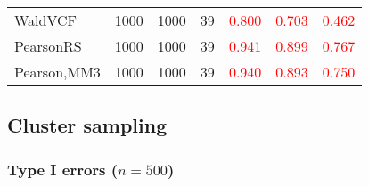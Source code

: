 \documentclass[
]{article}
\begin{document}
\begin{table}[H]
{\begin{tabular}[t]{lrrrrrr}
\hspace{1em}WaldVCF & 1000 & 1000 & 39 & \textcolor{red}{0.800} & \textcolor{red}{0.703} & \textcolor{red}{0.462}\\
\hspace{1em}PearsonRS & 1000 & 1000 & 39 & \textcolor{red}{0.941} & \textcolor{red}{0.899} & \textcolor{red}{0.767}\\
\hspace{1em}Pearson,MM3 & 1000 & 1000 & 39 & \textcolor{red}{0.940} & \textcolor{red}{0.893} & \textcolor{red}{0.750}\\
\bottomrule
\end{tabular}}
\endgroup{}
\end{table}

\hypertarget{cluster-sampling}{%
\subsection{Cluster sampling}\label{cluster-sampling}}

\hypertarget{type-i-errors-n500-2}{%
\subsubsection{\texorpdfstring{Type I errors
(\(n=500\))}{Type I errors (n=500)}}\label{type-i-errors-n500-2}}
\end{document}

